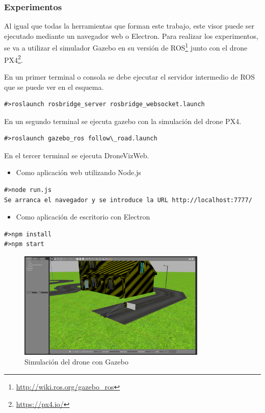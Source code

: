 \subsubsection{Experimentos}
Al igual que todas la herramientas que forman este trabajo, este visor puede ser ejecutado mediante un navegador web o Electron. Para realizar los experimentos, se va a utilizar el simulador Gazebo en su versión de ROS\footnote{\url{http://wiki.ros.org/gazebo_ros}} junto con el drone PX4\footnote{\url{https://px4.io/}}.

En un primer terminal o consola se debe ejecutar el servidor intermedio de ROS que se puede ver en el esquema.
\begin{lstlisting}[caption= Ejecución del servidor intermedio, label=cod.servidorintermediodrone]
#>roslaunch rosbridge_server rosbridge_websocket.launch
\end{lstlisting}

En un segundo terminal se ejecuta gazebo con la simulación del drone PX4.

\begin{lstlisting}[caption= Ejecución de gazebo con el drone PX4 label=cod.gazebodrone]
#>roslaunch gazebo_ros follow\_road.launch
\end{lstlisting}

En el tercer terminal se ejecuta DroneVizWeb.

\begin{itemize}
\item Como aplicación web utilizando Node.js
\end{itemize}
\begin{lstlisting}[caption= Ejecución con Node.js, label=cod.dronenodejs]
#>node run.js
Se arranca el navegador y se introduce la URL http://localhost:7777/
\end{lstlisting}
\begin{itemize}
\item Como aplicación de escritorio con Electron
\end{itemize}
\begin{lstlisting}[caption= Ejecución con Electron, label=cod.droneelectron]
#>npm install
#>npm start
\end{lstlisting}

\begin{figure}[H]
  \begin{center}
    \includegraphics[width=0.8\textwidth]{figures/gazebodrone.png}
    		\caption{Simulación del drone con Gazebo}
		\label{fig.testcamserver1}
		\end{center}
\end{figure}

